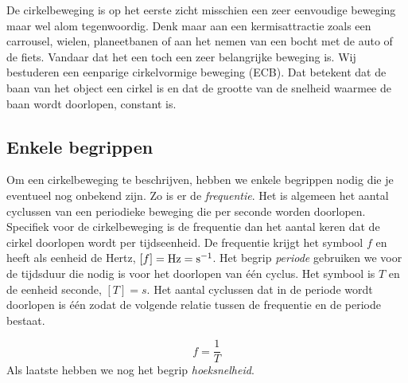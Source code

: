 \documentclass{ximera}
\begin{document}
	\author{Bart Lambregs}
    \xmsource\xmuitleg

De cirkelbeweging is op het eerste zicht misschien een zeer eenvoudige beweging maar wel alom tegenwoordig. 
Denk maar aan een kermisattractie zoals een carrousel, wielen, planeetbanen of aan het nemen van een bocht met de auto of de fiets. 
Vandaar dat het een toch een zeer belangrijke beweging is. 
Wij bestuderen een eenparige cirkelvormige beweging (ECB). 
Dat betekent dat de baan van het object een cirkel is en dat de grootte van de snelheid waarmee de baan wordt doorlopen, constant is.

\subsection{Enkele begrippen}

Om een cirkelbeweging te beschrijven, hebben we enkele begrippen nodig die je eventueel nog onbekend zijn. 
Zo is er de \emph{frequentie}. 
Het is algemeen het aantal cyclussen van een periodieke beweging die per seconde worden doorlopen. 
Specifiek voor de cirkelbeweging is de frequentie dan het aantal keren dat de cirkel doorlopen wordt per tijdseenheid. 
De frequentie krijgt het symbool $f$ en heeft als eenheid de Hertz, $[f]=\rm Hz=s^{-1}$. 
Het begrip \emph{periode} gebruiken we voor de tijdsduur die nodig is voor het doorlopen van \'e\'en cyclus. 
Het symbool is $T$ en de eenheid seconde, $[T]=s$. 
Het aantal cyclussen dat in de periode wordt doorlopen is één zodat de volgende relatie tussen de frequentie en de periode bestaat.

\begin{equation*}
	f=\frac{1}{T}
\end{equation*}
Als laatste hebben we nog het begrip \textit{hoeksnelheid}. 
\end{document}
